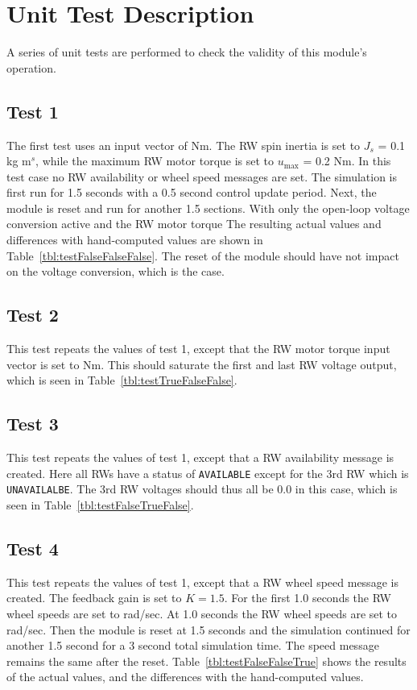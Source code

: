 \section{Unit Test Description}
A series of unit tests are performed to check the validity of this module's operation.

\subsection{Test 1}
The first test uses an input vector of  Nm.  The RW spin inertia is set to $J_{s}$ = 0.1 kg m$^{s}$, while the maximum RW motor torque is set to $u_{\text{max}}$ = 0.2 Nm.  In this test case no RW availability or wheel speed messages are set.  The simulation is first run for 1.5 seconds with a 0.5 second control update period.  Next, the module is reset and run for another 1.5 sections.  With only the open-loop voltage conversion active and the RW motor torque
The resulting actual values and differences with hand-computed values are shown in Table~\ref{tbl:testFalseFalseFalse}.  The reset of the module should have not impact on the voltage conversion, which is the case.


\subsection{Test 2}
This test repeats the values of test 1, except that the RW motor torque input vector is set to  Nm.  This should saturate the first and last RW voltage output, which is seen in Table~\ref{tbl:testTrueFalseFalse}. 


\subsection{Test 3}
This test repeats the values of test 1, except that a RW availability message is created.  Here all RWs have a status of {\tt AVAILABLE} except for the 3rd RW which is {\tt UNAVAILALBE}.    The 3rd RW voltages should thus all be 0.0 in this case, which is seen in Table~\ref{tbl:testFalseTrueFalse}. 


\subsection{Test 4}

This test repeats the values of test 1, except that a RW wheel speed message is created.  The feedback gain is set to $K = 1.5$.  For the first 1.0 seconds the RW wheel speeds are set to  rad/sec.  At 1.0 seconds the RW wheel speeds are set to   rad/sec.  Then the module is reset at 1.5 seconds and the simulation continued for another 1.5 second for a 3 second total simulation time.   The speed message remains the same after the reset.   Table~\ref{tbl:testFalseFalseTrue} shows the results of the actual values, and the differences with the hand-computed values.  


